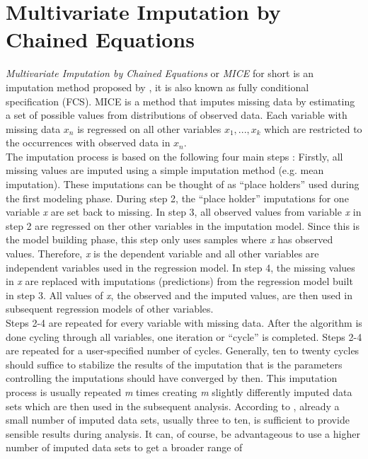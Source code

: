 \section{Multivariate Imputation by Chained Equations}
\textit{Multivariate Imputation by Chained Equations} or \textit{MICE} for 
short is an imputation method proposed by \citeauthor{RN135} \cite{RN135}, it 
is also known as fully conditional specification (FCS).
MICE is a method that imputes missing data by estimating a set of possible 
values from distributions of observed data. Each variable with missing data 
$x_n$ is regressed on all other variables $x_1, ..., x_k$ which are restricted 
to the occurrences with observed data in $x_n$.
\\
The imputation process is based on the following four main steps \cite{RN142, 
RN141}: Firstly, all missing values are imputed using a simple imputation 
method (e.g. mean imputation). These imputations can be thought of as ``place 
holders'' used during the first modeling phase. During step 2, the ``place 
holder'' imputations for one variable \textit{x} are set back to missing. In 
step 3, all observed values from variable \textit{x} in step 2 are regressed on 
ther other variables in the imputation model. Since this is the model building 
phase, this step only uses samples where \textit{x} has observed values. 
Therefore, \textit{x} is the dependent variable and all other variables are 
independent variables used in the regression model. In step 4, the missing 
values in \textit{x} are replaced with imputations (predictions) from the 
regression model built in step 3. All values of \textit{x}, the observed and the 
imputed values, are then used in subsequent regression models of other 
variables.
\\
Steps 2-4 are repeated for every variable with missing data. After the 
algorithm is done cycling through all variables, one iteration or ``cycle'' is 
completed. Steps 2-4 are repeated for a user-specified number of cycles. 
Generally, ten to twenty cycles should suffice to stabilize the results of the 
imputation that is the parameters controlling the imputations should have 
converged by then. This imputation process is usually repeated \textit{m} times 
creating \textit{m} slightly differently imputed data sets which are then used 
in the subsequent analysis. According to \cite{RN144, RN141, RN142}, already a 
small number of imputed data sets, usually three to ten, is sufficient to 
provide sensible results during analysis. It can, of course, be advantageous 
to use a higher number of imputed data sets to get a broader range of 
